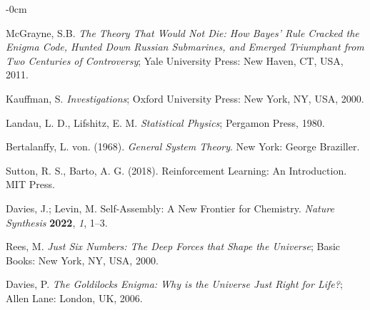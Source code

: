 \documentclass[entropy,article,submit,pdftex,moreauthors]{Definitions/mdpi}
\begin{document}
\begin{adjustwidth}{-\extralength}{0cm}
\begin{thebibliography}{999}
McGrayne, S.B. \textit{The Theory That Would Not Die: How Bayes' Rule Cracked the Enigma Code, Hunted Down Russian Submarines, and Emerged Triumphant from Two Centuries of Controversy}; Yale University Press: New Haven, CT, USA, 2011.

Kauffman, S. \textit{Investigations}; Oxford University Press: New York, NY, USA, 2000.

Landau, L. D., Lifshitz, E. M. \textit{Statistical Physics}; Pergamon Press, 1980.

Bertalanffy, L. von. (1968). \textit{General System Theory}. New York: George Braziller.

Sutton, R. S., Barto, A. G. (2018). Reinforcement Learning: An Introduction. MIT Press.

Davies, J.; Levin, M. Self-Assembly: A New Frontier for Chemistry. \textit{Nature Synthesis} \textbf{2022}, \textit{1}, 1–3.

Rees, M. \textit{Just Six Numbers: The Deep Forces that Shape the Universe}; Basic Books: New York, NY, USA, 2000.

Davies, P. \textit{The Goldilocks Enigma: Why is the Universe Just Right for Life?}; Allen Lane: London, UK, 2006.


\end{thebibliography}

%


\PublishersNote{}
\end{adjustwidth}
\end{document}
